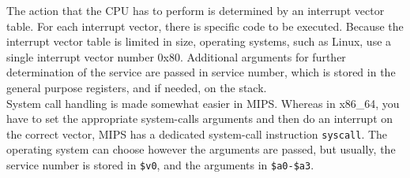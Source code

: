 The action that the CPU has to perform is determined by an interrupt vector
table. For each interrupt vector, there is specific code to be executed.
Because the interrupt vector table is limited in size, operating systems, such
as Linux, use a single interrupt vector number 0x80. Additional arguments for
further determination of the service are passed in service number, which is
stored in the general purpose registers, and if needed, on the stack.\\
System call handling is made somewhat easier in MIPS. Whereas in x86\_64, you
have to set the appropriate system-calls arguments and then do an interrupt on
the correct vector, MIPS has a dedicated system-call instruction
\texttt{syscall}. The operating system can choose however the arguments are
passed, but usually, the service number is stored in \texttt{\$v0}, and the
arguments in \texttt{\$a0-\$a3}\cite{COD5}.


